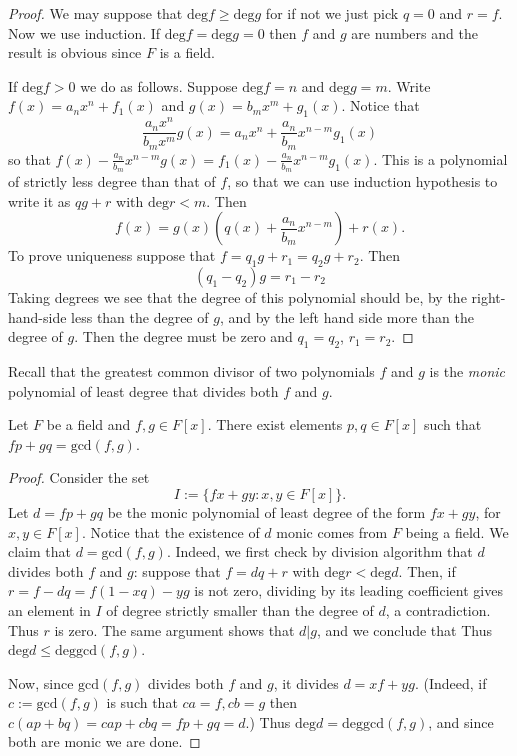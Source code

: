 \begin{proof}
We may suppose that $\text{deg}f \geq \text{deg}g$ for if not we just pick
$q=0$ and $r=f$. Now we use induction. 
If $\text{deg}f=\text{deg}g=0$ then $f$ and $g$ are numbers and the result is
obvious since $F$ is a field.

If $\text{deg}f>0$ we do as follows. Suppose $\text{deg}f=n$ and
$\text{deg}g=m$. Write $f(x)=a_nx^n+f_1(x)$ and $g(x)=b_mx^m+g_1(x)$. Notice
that
$$
\frac{a_nx^n}{b_mx^m}g(x)=a_nx^n+\frac{a_n}{b_m}x^{n-m}g_1(x)
$$
so that $f(x)-\frac{a_n}{b_m}x^{n-m}g(x)=f_1(x)-\frac{a_n}{b_m}x^{n-m}g_1(x)$.
This is a polynomial of strictly less degree than that of $f$, so that we can
use induction hypothesis to write it as $qg+r$ with $\text{deg}r<m$. Then
$$
f(x)=g(x)\left(q(x)+\frac{a_n}{b_m}x^{n-m}\right)+r(x).
$$
To prove uniqueness suppose that $f=q_1g+r_1=q_2g+r_2$.
Then
$$
(q_1-q_2)g=r_1-r_2
$$
Taking degrees we see that the degree of this polynomial should be,
by the right-hand-side less than the degree of $g$,
and by the left hand side more than the degree of $g$.
Then the degree must be zero and $q_1=q_2$, $r_1=r_2$.
\end{proof}

Recall that the greatest common divisor of two polynomials $f$ and $g$ 
is the {\it monic}
polynomial of least degree that divides both $f$ and $g$.

\begin{theorem}
\label{theorem-Bachet-Bezout-for-polynomials-over-field}
\begin{reference}
\cite[Theorem 1.53]{MMST}
\end{reference}
Let $F$ be a field and $f,g\in F[x]$. 
There exist elements  $p,q \in F[x]$ such that $fp+gq=\text{gcd}(f,g)$.
\end{theorem}

\begin{proof}
Consider the set
$$
I:=\{fx+gy:x,y \in F[x]\}.
$$
Let $d=fp+gq$ be the monic polynomial of least degree 
of the form $fx+gy$, for $x,y \in F[x]$.
Notice that the existence of $d$ monic comes from $F$ being a field.
We claim that $d=\text{gcd}(f,g)$. 
Indeed, we first check by division algorithm
that $d$ divides both $f$ and $g$: 
suppose that $f=dq+r$ with $\text{deg}r<\text{deg}d$. 
Then, if $r=f-dq=f(1-xq)-yg$ is not zero, 
dividing by its leading coefficient gives an element in $I$ 
of degree strictly smaller than the degree of $d$, a contradiction.
Thus $r$ is zero. The same argument shows that $d|g$, and we conclude that
Thus $\text{deg}d \leq \text{deg}\text{gcd}(f,g)$. 

Now, since
$\text{gcd}(f,g)$ divides both $f$ and $g$, it divides $d=xf+yg$. (Indeed, if
$c:=\text{gcd}(f,g)$ is such that $ca=f,cb=g$ then $c(ap+bq)=cap+cbq=fp+gq=d$.) 
Thus $\text{deg}d=\text{deg}\text{gcd}(f,g)$, and since both are monic we are
done.
\end{proof}

